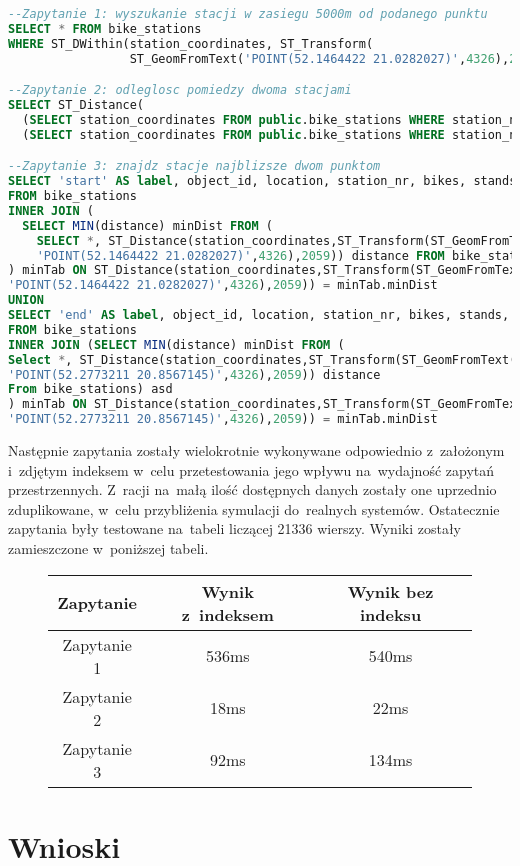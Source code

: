 \documentclass[11pt,a4paper]{article}
\begin{document}
\begin{lstlisting}[language=SQL,caption=Zapytania służące do testowania indeksu.]
--Zapytanie 1: wyszukanie stacji w zasiegu 5000m od podanego punktu
SELECT * FROM bike_stations
WHERE ST_DWithin(station_coordinates, ST_Transform(
                 ST_GeomFromText('POINT(52.1464422 21.0282027)',4326),2059), 5000);

--Zapytanie 2: odleglosc pomiedzy dwoma stacjami
SELECT ST_Distance(
  (SELECT station_coordinates FROM public.bike_stations WHERE station_nr = 6300),
  (SELECT station_coordinates FROM public.bike_stations WHERE station_nr = 6301))

--Zapytanie 3: znajdz stacje najblizsze dwom punktom
SELECT 'start' AS label, object_id, location, station_nr, bikes, stands, minDist
FROM bike_stations
INNER JOIN (
  SELECT MIN(distance) minDist FROM (
    SELECT *, ST_Distance(station_coordinates,ST_Transform(ST_GeomFromText(
    'POINT(52.1464422 21.0282027)',4326),2059)) distance FROM bike_stations) asd
) minTab ON ST_Distance(station_coordinates,ST_Transform(ST_GeomFromText(
'POINT(52.1464422 21.0282027)',4326),2059)) = minTab.minDist
UNION
SELECT 'end' AS label, object_id, location, station_nr, bikes, stands, minDist
FROM bike_stations
INNER JOIN (SELECT MIN(distance) minDist FROM (
Select *, ST_Distance(station_coordinates,ST_Transform(ST_GeomFromText(
'POINT(52.2773211 20.8567145)',4326),2059)) distance
From bike_stations) asd
) minTab ON ST_Distance(station_coordinates,ST_Transform(ST_GeomFromText(
'POINT(52.2773211 20.8567145)',4326),2059)) = minTab.minDist
\end{lstlisting}

Następnie zapytania zostały wielokrotnie wykonywane odpowiednio z~założonym i~zdjętym indeksem w~celu przetestowania jego wpływu na~wydajność zapytań przestrzennych. Z~racji na~małą ilość dostępnych danych zostały one uprzednio zduplikowane, w~celu przybliżenia symulacji do~realnych systemów. Ostatecznie zapytania były testowane na~tabeli liczącej 21336 wierszy. Wyniki zostały zamieszczone w~poniższej tabeli.

\begin{figure}[H]
\begin{tabular}{ | c | c | c | }
\hline \textbf{Zapytanie} & \textbf{Wynik z~indeksem} & \textbf{Wynik bez indeksu} \\ \hline
  Zapytanie 1 & 536ms & 540ms \\ \hline
  Zapytanie 2 & 18ms & 22ms \\ \hline
  Zapytanie 3 & 92ms & 134ms \\ \hline
\end{tabular}
\end{figure}

\section{Wnioski}
\end{document}

